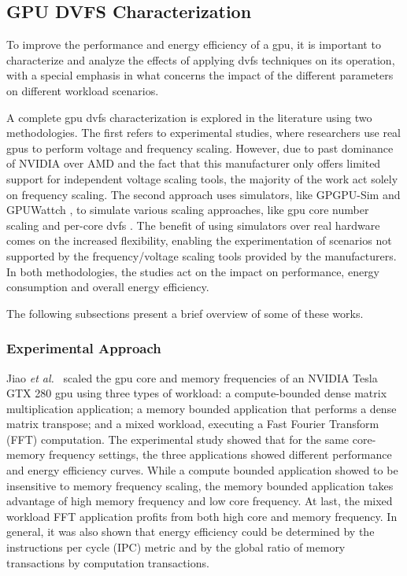 \subsection{GPU DVFS Characterization}

To improve the performance and energy efficiency of a \acrshort{gpu}, it is important to characterize and analyze the effects of applying \acrshort{dvfs} techniques on its operation, with a special emphasis in what concerns the impact of the different parameters on different workload scenarios. 

A complete \acrshort{gpu} \acrshort{dvfs} characterization is explored in the literature using two methodologies. The first refers to experimental studies, where researchers use real \acrshort{gpu}s to perform voltage and frequency scaling. However, due to past dominance of NVIDIA over AMD \cite{noauthor_jon_2018, mujtaba_amd_2019} and the fact that this manufacturer only offers limited support for independent voltage scaling tools, the majority of the work act solely on frequency scaling. The second approach uses simulators, like GPGPU-Sim \cite{noauthor_gpgpu-sim/gpgpu-sim_distribution_2019} and GPUWattch \cite{noauthor_gpu_2011, leng_gpuwattch:_2013},  to simulate various scaling approaches, like \acrshort{gpu} core number scaling and per-core \acrshort{dvfs} \cite{mei_survey_2016}. The benefit of using simulators over real hardware comes on the increased flexibility, enabling the experimentation of scenarios not supported by the frequency/voltage scaling tools provided by the manufacturers. In both methodologies, the studies act on the impact on performance, energy consumption and overall energy efficiency.

The following subsections present a brief overview of some of these works.


\subsubsection{Experimental Approach}

Jiao \textit{et al.}~\cite{jiao_power_2010} scaled the \acrshort{gpu} core and memory frequencies of an NVIDIA Tesla GTX 280 \acrshort{gpu} using three types of workload: a compute-bounded dense matrix multiplication application; a memory bounded application that performs a dense matrix transpose; and a mixed workload, executing a Fast Fourier Transform (FFT) computation. The experimental study showed that for the same core-memory frequency settings, the three applications showed different performance and energy efficiency curves. While a compute bounded application showed to be insensitive to memory frequency scaling, the memory bounded application takes advantage of high memory frequency and low core frequency. At last, the mixed workload FFT application profits from both high core and memory frequency. In general, it was also shown that energy efficiency could be determined by the instructions per cycle (IPC) metric and by the global ratio of memory transactions by computation transactions.

